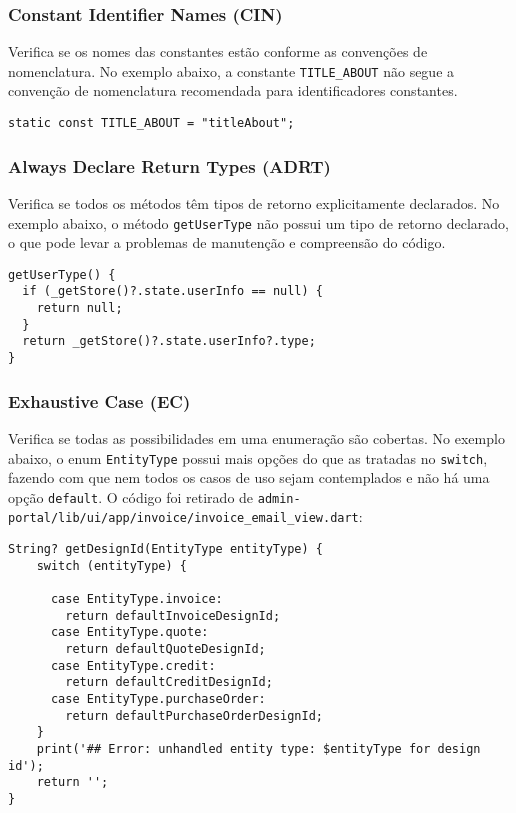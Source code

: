 \documentclass[12pt]{article}
\begin{document}
\subsubsection{Constant Identifier Names (CIN)}
Verifica se os nomes das constantes estão conforme as convenções de nomenclatura. No exemplo abaixo, a constante \texttt{TITLE\_ABOUT} não segue a convenção de nomenclatura recomendada para identificadores constantes.

\begin{tcolorbox}[codeSnippetStyle={WhatTodo/lib/utils/keys.dart}]
\begin{verbatim}
static const TITLE_ABOUT = "titleAbout";
\end{verbatim}
\end{tcolorbox}

\subsubsection{Always Declare Return Types (ADRT)}
Verifica se todos os métodos têm tipos de retorno explicitamente declarados. No exemplo abaixo, o método \texttt{getUserType} não possui um tipo de retorno declarado, o que pode levar a problemas de manutenção e compreensão do código.

\begin{tcolorbox}[codeSnippetStyle={gsy\_github\_app\_flutter/lib/page/my\_page.dart}]
\begin{verbatim}
getUserType() {
  if (_getStore()?.state.userInfo == null) {
    return null;
  }
  return _getStore()?.state.userInfo?.type;
}
\end{verbatim}
\end{tcolorbox}

\subsubsection{Exhaustive Case (EC)}
Verifica se todas as possibilidades em uma enumeração são cobertas. No exemplo abaixo, o enum \texttt{EntityType} possui mais opções do que as tratadas no \texttt{switch}, fazendo com que nem todos os casos de uso sejam contemplados e não há uma opção \texttt{default}. O código foi retirado de \texttt{admin-portal/lib/ui/app/invoice/invoice\_email\_view.dart}:

\begin{tcolorbox}[codeSnippetStyle={gsy\_github\_app\_flutter/lib/page/my\_page.dart}]
\begin{verbatim}
String? getDesignId(EntityType entityType) {
    switch (entityType) {
    
      case EntityType.invoice:
        return defaultInvoiceDesignId;
      case EntityType.quote:
        return defaultQuoteDesignId;
      case EntityType.credit:
        return defaultCreditDesignId;
      case EntityType.purchaseOrder:
        return defaultPurchaseOrderDesignId;
    }
    print('## Error: unhandled entity type: $entityType for design id');
    return '';
}
\end{verbatim}
\end{tcolorbox}
\end{document}
